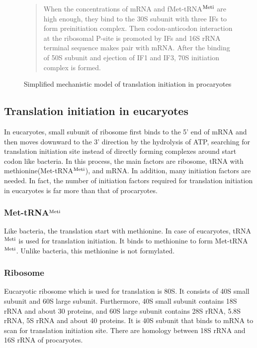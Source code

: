 \begin{figure}
\begin{center}
\end{center}
\caption{Simplified mechanistic model of translation initiation in
procaryotes}
\begin{quotation}
\begin{small}
When the concentrations of mRNA and fMet-tRNA$^{\rm Meti}$ are high
enough, they bind to the 30S subunit with three IFs to form
preinitiation complex. Then codon-anticodon interaction at the ribosomal
P-site is promoted by IFs and 16S rRNA terminal sequence makes pair with
mRNA. After the binding of 50S subunit and ejection of IF1 and IF3, 70S
initiation complex is formed.
\end{small}
\end{quotation}
\end{figure}



\subsection{Translation initiation in eucaryotes}
In eucaryotes, small subunit of ribosome first binds to the 5' end of
mRNA and then moves downward to the 3' direction by the hydrolysis of
ATP, searching for translation initiation site instead of directly
forming complexes around start codon like bacteria. In this process,
the main factors are ribosome, tRNA with methionine(Met-tRNA$^{\rm
Meti}$), and mRNA. In addition, many initiation factors are needed. In
fact, the number of initiation factors required for translation
initiation in eucaryotes is far more than that of procaryotes.

\subsubsection{Met-tRNA$^{\rm Meti}$}
Like bacteria, the translation start with methionine.
In case of eucaryotes, tRNA$^{\rm Meti}$ is used for translation initiation.
It binds to methionine to form Met-tRNA$^{\rm Meti}$. Unlike bacteria,
this methionine is not formylated.

\subsubsection{Ribosome}
Eucaryotic ribosome which is used for translation is 80S. It consists
of 40S small subunit and 60S large subunit. Furthermore,
40S small subunit contains 18S rRNA and about 30 proteins,
and 60S large subunit contains 28S rRNA, 5.8S rRNA, 5S rRNA and
about 40 proteins. It is 40S subunit that binds to mRNA to scan for
translation initiation site. There are homology between 18S rRNA and
16S rRNA of procaryotes.

